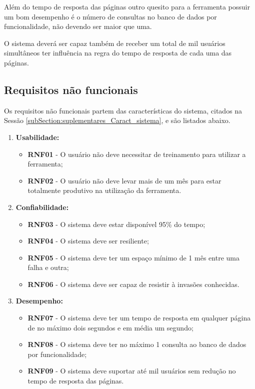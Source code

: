 	Além do tempo de resposta das páginas outro quesito para a ferramenta possuir um bom desempenho é o número de consultas no banco de dados por funcionalidade, não devendo ser maior que uma.

	O sistema deverá ser capaz também de receber um total de mil usuários simultâneos ter influência na regra do tempo de resposta de cada uma das páginas.

\subsection{Requisitos não funcionais}

	Os requisitos não funcionais partem das características do sistema, citados na Sessão \ref{subSection:suplementares_Caract_sistema}, e são listados abaixo. 

	\begin{enumerate}
		\item \textbf{Usabilidade:}
			\begin{itemize}
				\item \textbf{RNF01} - O usuário não deve necessitar de treinamento para utilizar a ferramenta;
				\item \textbf{RNF02} - O usuário não deve levar mais de um mês para estar totalmente produtivo na utilização da ferramenta.
			\end{itemize}
		\item \textbf{Confiabilidade:}
			\begin{itemize}
				\item \textbf{RNF03} - O sistema deve estar disponível 95\% do tempo;
				\item \textbf{RNF04} - O sistema deve ser resiliente;
				\item \textbf{RNF05} - O sistema deve ter um espaço mínimo de 1 mês entre uma falha e outra;
				\item \textbf{RNF06} - O sistema deve ser capaz de resistir à invasões conhecidas.
			\end{itemize}
		\item \textbf{Desempenho:}
			\begin{itemize}
				\item \textbf{RNF07} - O sistema deve ter um tempo de resposta em qualquer página de no máximo dois segundos e em média um segundo;
				\item \textbf{RNF08} - O sistema deve ter no máximo 1 consulta ao banco de dados por funcionalidade;
				\item \textbf{RNF09} - O sistema deve suportar até mil usuários sem redução no tempo de resposta das páginas.
			\end{itemize}
	\end{enumerate}